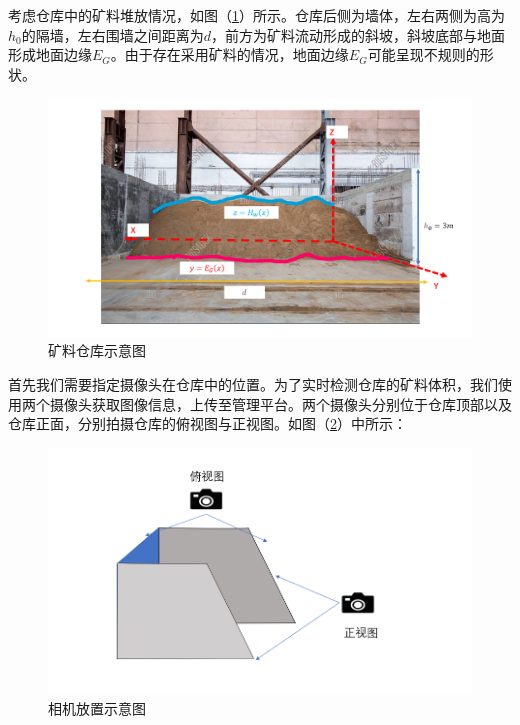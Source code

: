 \documentclass{my_paper}
\begin{document}
    考虑仓库中的矿料堆放情况，如图（\ref{kuang_1}）所示。仓库后侧为墙体，左右两侧为高为$h_0$的隔墙，左右围墙之间距离为$d$，前方为矿料流动形成的斜坡，斜坡底部与地面形成地面边缘$E_G$。由于存在采用矿料的情况，地面边缘$E_G$可能呈现不规则的形状。

    \begin {figure}[h]
    \centering %
    \includegraphics[width=\textwidth]{kuang_1.png}
    \caption{矿料仓库示意图} %
    \label{kuang_1}
    \end {figure}

    首先我们需要指定摄像头在仓库中的位置。为了实时检测仓库的矿料体积，我们使用两个摄像头获取图像信息，上传至管理平台。两个摄像头分别位于仓库顶部以及仓库正面，分别拍摄仓库的俯视图与正视图。如图（\ref{camera_lay}）中所示：

    \begin {figure}[h]
    \centering %
    \includegraphics[width=\textwidth]{camera_lay.png}
    \caption{相机放置示意图} %
    \label{camera_lay}
    \end {figure}
\end{document}
